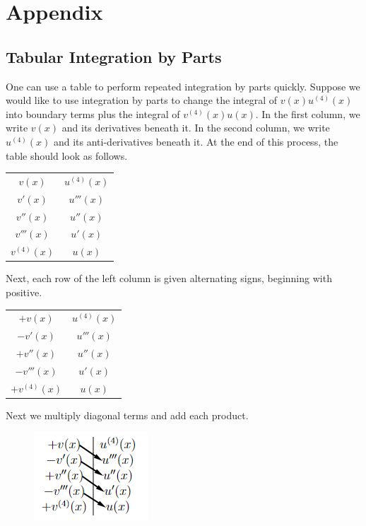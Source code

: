 \newpage
\section{Appendix}
\subsection{Tabular Integration by Parts}
    One can use a table to perform repeated integration by parts quickly. Suppose we would like to use integration by parts to change the integral of \(v(x)u^{(4)}(x)\) into boundary terms plus the integral of \(v^{(4)}(x)u(x)\). In the first column, we write \(v(x)\) and its derivatives beneath it. In the second column, we write \(u^{(4)}(x)\) and its anti-derivatives beneath it. At the end of this process, the table should look as follows.
    \begin{table}[H]
        \centering
        \begin{tabular}{c|c}
            \(v(x)\) & \(u^{(4)}(x)\)\\
            \(v'(x)\) & \(u'''(x)\)\\
            \(v''(x)\) & \(u''(x)\)\\
            \(v'''(x)\) & \(u'(x)\)\\
            \(v^{(4)}(x)\) &\(u(x)\)
        \end{tabular}
    \end{table}
    Next, each row of the left column is given alternating signs, beginning with positive.
    \begin{table}[H]
        \centering
        \begin{tabular}{c|c}
            \(+v(x)\) & \(u^{(4)}(x)\)\\
            \(-v'(x)\) & \(u'''(x)\)\\
            \(+v''(x)\) & \(u''(x)\)\\
            \(-v'''(x)\) & \(u'(x)\)\\
            \(+v^{(4)}(x)\) &\(u(x)\)
        \end{tabular}
    \end{table}
    Next we multiply diagonal terms and add each product.
    \begin{figure}[H]
        \centering
        \includegraphics{include/tabular-boundary.png}
    \end{figure}
